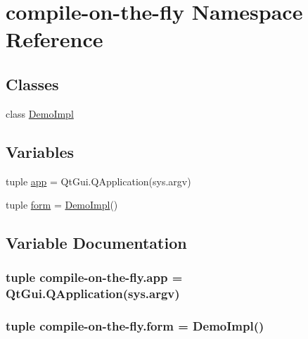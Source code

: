 \hypertarget{namespacecompile-on-the-fly}{}\section{compile-\/on-\/the-\/fly Namespace Reference}
\label{namespacecompile-on-the-fly}
\subsection*{Classes}
\begin{DoxyCompactItemize}
\item 
class \hyperlink{classcompile-on-the-fly_1_1DemoImpl}{Demo\+Impl}
\end{DoxyCompactItemize}
\subsection*{Variables}
\begin{DoxyCompactItemize}
\item 
tuple \hyperlink{namespacecompile-on-the-fly_a4cf7e648c5fc9046228fa1398e020e36}{app} = Qt\+Gui.\+Q\+Application(sys.\+argv)
\item 
tuple \hyperlink{namespacecompile-on-the-fly_ac173e2f992355532c516086827a24bfa}{form} = \hyperlink{classcompile-on-the-fly_1_1DemoImpl}{Demo\+Impl}()
\end{DoxyCompactItemize}


\subsection{Variable Documentation}
\hypertarget{namespacecompile-on-the-fly_a4cf7e648c5fc9046228fa1398e020e36}{}
\subsubsection[{app}]{\setlength{\rightskip}{0pt plus 5cm}tuple compile-\/on-\/the-\/fly.\+app = Qt\+Gui.\+Q\+Application(sys.\+argv)}\label{namespacecompile-on-the-fly_a4cf7e648c5fc9046228fa1398e020e36}
\hypertarget{namespacecompile-on-the-fly_ac173e2f992355532c516086827a24bfa}{}
\subsubsection[{form}]{\setlength{\rightskip}{0pt plus 5cm}tuple compile-\/on-\/the-\/fly.\+form = {\bf Demo\+Impl}()}\label{namespacecompile-on-the-fly_ac173e2f992355532c516086827a24bfa}
